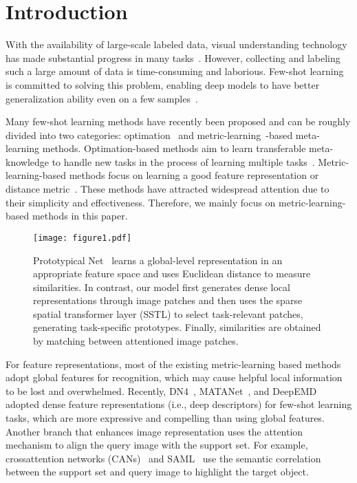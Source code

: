 \documentclass{SCIS2019}
\begin{document}
\maketitle


\section{Introduction}
With the availability of large-scale labeled data, visual understanding technology has made substantial progress in many tasks~\cite{1,2}. However, collecting and labeling such a large amount of data is time-consuming and laborious. Few-shot learning is committed to solving this problem, enabling deep models to have better generalization ability even on a few samples~\cite{41,42,43}.

Many few-shot learning methods have recently been proposed and can be roughly divided into two categories: optimation~\cite{3,4,5} and metric-learning~\cite{6,7,8,9,10}-based meta-learning methods. Optimation-based methods aim to learn transferable meta-knowledge to handle new tasks in the process of learning multiple tasks~\cite{3}. Metric-learning-based methods focus on learning a good feature representation or distance metric~\cite{7,10}. These methods have attracted widespread attention due to their simplicity and effectiveness. Therefore, we mainly focus on metric-learning-based methods in this paper.

\begin{figure}[t]
	\centering
	\texttt{[image: figure1.pdf]} \caption{Prototypical Net~\cite{7} learns a global-level representation in an appropriate feature space and uses Euclidean distance to measure similarities. In contrast, our model first generates dense local representations through image patches and then uses the sparse spatial transformer layer (SSTL) to select task-relevant patches, generating task-specific prototypes. Finally, similarities are obtained by matching between attentioned image patches.}
\end{figure}
For feature representations, most of the existing metric-learning based methods~\cite{6,7,11} adopt global features for recognition, which may cause helpful local information to be lost and overwhelmed.
Recently, DN4~\cite{9}, MATANet~\cite{12}, and DeepEMD~\cite{13} adopted dense feature representations (i.e., deep descriptors) for few-shot learning tasks, which are more expressive and compelling than using global features. Another branch that enhances image representation uses the attention mechanism to align the query image with the support set. For example, crossattention networks (CANs)~\cite{14} and SAML~\cite{15} use the semantic correlation between the support set and query image to highlight the target object.
\end{document}
